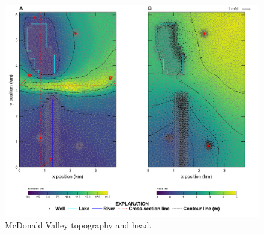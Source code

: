\documentclass[11pt, oneside]{article}  	%
\begin{document}
\begin{figure}[ht!]
	\begin{center}
		\includegraphics{figures/mv_voronoi_map.png}
	\end{center}
	\caption{McDonald Valley topography and head.}
	\label{fig:mvmap}
\end{figure}

\end{document}
